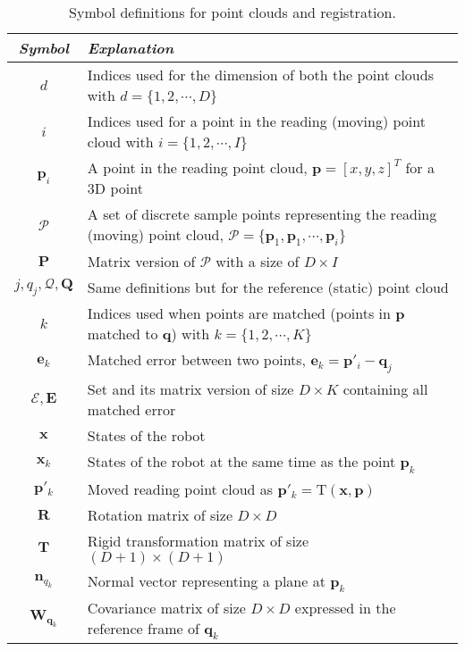 \documentclass[10pt,letterpaper,oneside]{article}
\begin{document}
\begin{table}[htbp]
\centering
\caption{Symbol definitions for point clouds and registration.}
\label{tab:pointCloudSymbols}
\begin{tabu}{cX}

\toprule
\emph{Symbol} & \emph{Explanation} \\
\midrule

$d$ & Indices used for the dimension of both the point clouds with $d = \{1,2, \cdots, D\}$ \\
$i$ & Indices used for a point in the reading (moving) point cloud with $i = \{1,2, \cdots, I\}$\\
$\bm{p}_i$ & A point in the reading point cloud, $\bm{p} = [x, y, z]^T$ for a 3D point\\
$\mathcal{P}$ & A set of discrete sample points representing the reading (moving) point cloud,  $\mathcal{P} = \{\bm{p}_1, \bm{p}_1, \cdots, \bm{p}_i\}$ \\
$\bm{P}$ & Matrix version of $\mathcal{P}$ with a size of $D \times I$ \\

$j, q_j, \mathcal{Q}, \bm{Q}$ & Same definitions but for the reference (static) point cloud \\

$k$ & Indices used when points are matched (points in $\bm{p}$ matched to $\bm{q}$) with $k = \{1,2, \cdots, K\}$\\
$\bm{e}_k$ & Matched error between two points, $\bm{e}_k = \bm{p}'_i - \bm{q}_j$ \\
$\mathcal{E}, \bm{E}$ & Set and its matrix version of size $D \times K$ containing all matched error \\

$\bm{x}$ & States of the robot \\
$\bm{x}_k$ & States of the robot at the same time as the point $\bm{p}_k$ \\
$\bm{p}'_k$ & Moved reading point cloud as  $\bm{p}'_k = \mathrm{T}(\bm{x}, \bm{p})$ \\
$\bm{R}$ & Rotation matrix of size $D \times D$ \\
$\bm{T}$ & Rigid transformation matrix of size $(D+1) \times (D+1)$ \\
$\bm{n}_{q_k}$ & Normal vector representing a plane at $\bm{p}_k$ \\
$\bm{W}_{\bm{q}_k}$ & Covariance matrix of size $D \times D$ expressed in the reference frame of $\bm{q}_k$\\
\bottomrule

\end{tabu}
\end{table}
\end{document}
